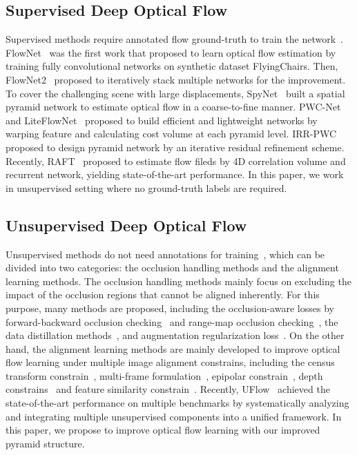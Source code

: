 \documentclass[final]{cvpr}
\begin{document}
\subsection{Supervised Deep Optical Flow}\label{sec:related_supervised_methods}
Supervised methods require annotated flow ground-truth to train the network~\cite{cnn_patch_match2017,zhao2020maskflownet,CostVolume_cvpr2017,VolumetricCN2019}.  FlowNet~\cite{Flownet_flyingchairs} was the first work that proposed to learn optical flow estimation by training fully convolutional networks on synthetic dataset FlyingChairs. 
Then, FlowNet2~\cite{FlowNet2} proposed to iteratively stack multiple networks for the improvement.
To cover the challenging scene with large displacements, SpyNet~\cite{spynet2017} built a spatial pyramid network to estimate optical flow in a coarse-to-fine manner. 
PWC-Net~\cite{pwc_net} and LiteFlowNet~\cite{LiteFlowNet} proposed to build efficient and lightweight networks by warping feature and calculating cost volume at each pyramid level. 
IRR-PWC~\cite{irrpwc} proposed to design pyramid network by an iterative residual refinement scheme.
Recently, RAFT~\cite{raft2020} proposed to estimate flow fileds by 4D correlation volume and recurrent network, yielding state-of-the-art performance.
In this paper, we work in unsupervised setting where no ground-truth labels are required. 


\subsection{Unsupervised Deep Optical Flow} \label{sec:related_unsup_methods}
Unsupervised methods do not need annotations for training~\cite{unsup_ICIP_2016,Jason2016}, which can be divided into two categories: the occlusion handling methods and the alignment learning methods. The occlusion handling methods mainly focus on excluding the impact of the occlusion regions that cannot be aligned inherently. For this purpose, many methods are proposed, including the occlusion-aware losses by forward-backward occlusion checking~\cite{unflow_2018aaai} and range-map occlusion checking~\cite{wang2018}, the data distillation methods~\cite{Pengpeng2019,Liu2019CVPR,tip_STFlow}, and augmentation regularization loss~\cite{liu2020learning}. On the other hand, the alignment learning methods are mainly developed to improve optical flow learning under multiple image alignment constrains, including the census transform constrain~\cite{Ren2017aaai}, multi-frame formulation~\cite{unflow_multi_occ}, epipolar constrain~\cite{Epipolar_flow_2019cvpr}, depth  constrains~\cite{Anurag2019,dfnet_zou_2018,Yin2018GeoNetUL,Liu2019UnsupervisedLO} and feature similarity constrain~\cite{simFlow2020eccv}. Recently, UFlow~\cite{jonschkowski2020matters} achieved the state-of-the-art performance on multiple benchmarks by systematically analyzing and integrating multiple unsupervised components into a unified framework. In this paper, we propose to improve optical flow learning with our improved pyramid structure. 
\end{document}
